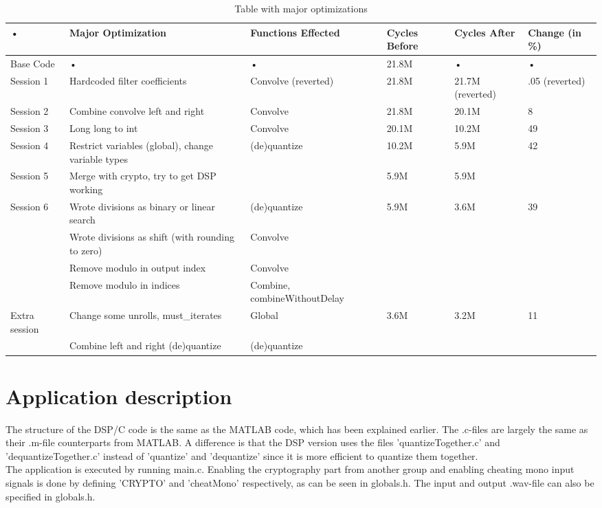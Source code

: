 \documentclass[a4paper]{article}
\begin{document}
\begin{table}
\begin{tabular}{|p{2cm}|p{3cm}|p{3cm}|p{2cm}|p{2cm}|p{1cm}|}
\hline 
• & Major Optimization & Functions Effected & Cycles Before & Cycles After & Change (in \%) \\ 
\hline 
Base Code & • & • & 21.8M & • & • \\ 
\hline 
Session 1 & Hardcoded filter coefficients & Convolve (reverted) & 21.8M & 21.7M (reverted) & .05 (reverted)\\ 
\hline 
Session 2 & Combine convolve left and right & Convolve & 21.8M & 20.1M & 8 \\ 
\hline 
Session 3 & Long long to int & Convolve & 20.1M & 10.2M & 49 \\ 
\hline 
Session 4 & Restrict variables (global), change variable types & (de)quantize & 10.2M & 5.9M & 42 \\ 
\hline 
Session 5 & Merge with crypto, try to get DSP working & & 5.9M & 5.9M & \\
\hline
Session 6 & Wrote divisions as binary or linear search & (de)quantize & 5.9M & 3.6M & 39 \\
\hline
& Wrote divisions as shift (with rounding to zero) & Convolve & & & \\
\hline
& Remove modulo in output index & Convolve & & & \\
\hline
& Remove modulo in indices & Combine, combineWithoutDelay & & & \\
\hline
Extra session & Change some unrolls, must\_iterates & Global & 3.6M & 3.2M & 11 \\
\hline
& Combine left and right (de)quantize & (de)quantize & & & \\
\hline
\end{tabular} 
\caption{Table with major optimizations}
\label{table:optimizations}
\end{table}

\section{Application description}
The structure of the DSP/C code is the same as the MATLAB code, which has been explained earlier. The .c-files are largely the same as their .m-file counterparts from MATLAB. A difference is that the DSP version uses the files 'quantizeTogether.c' and 'dequantizeTogether.c' instead of 'quantize' and 'dequantize' since it is more efficient to quantize them together.\\
The application is executed by running main.c. Enabling the cryptography part from another group and enabling cheating mono input signals is done by defining 'CRYPTO' and 'cheatMono' respectively, as can be seen in globals.h. The input and output .wav-file can also be specified in globals.h.
\end{document}
